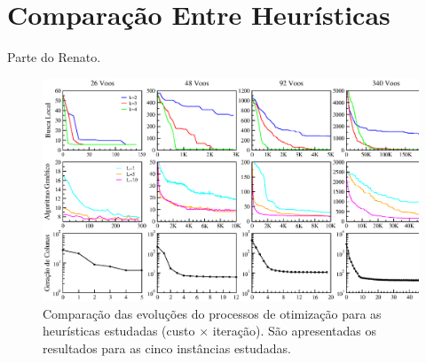 
\section{Comparação Entre Heurísticas}
\label{sec:comparacao}

Parte do Renato.

\begin{figure}[htbp]
	\begin{center}
		\includegraphics[scale=0.625]{fig/results.eps}
		\caption{Comparação das evoluções do processos de otimização para as heurísticas estudadas 
		(custo $\times$ iteração). São apresentadas os resultados para as cinco instâncias estudadas.}
		\label{fig:comparacao}
	\end{center}
\end{figure}


